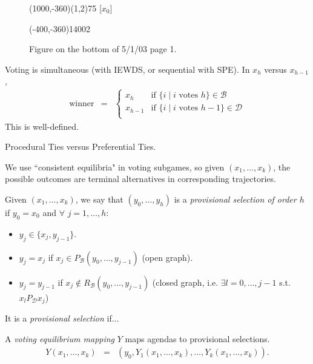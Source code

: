 \documentclass[12pt]{article}
\newcommand{\n}{\noindent}
\newcommand{\s}{\vspace{5mm}}
\begin{document}
\begin{figure}[htb]
\begin{egame}
\putbranch(1000,-360)(1,2){75}
\ib{}{}[$x_0$]






\infoset(-400,-360){1400}{2}
%
\end{egame}
\hspace*{\fill}\s\s\s\s\s\s\s\s\s\s\s\s
\caption[]{Figure on the bottom of 5/1/03 page 1.}\label{f:sixteen}
\end{figure}



\s
\n Voting is simultaneous (with IEWDS, or sequential with SPE).  In $x_h$ versus $x_{h-1}$,
\begin{eqnarray*}
\mbox{winner}&=&\left\{\begin{array}{ll}
x_h&\mbox{if }\{i\mid i\mbox{ votes }h\}\in\mathcal{B}\\
x_{h-1}&\mbox{if }\{i\mid i\mbox{ votes }h-1\}\in\mathcal{D}\\
\end{array}\right.
\end{eqnarray*}  This is well-defined.

\s
\n  Procedural Ties versus Preferential Ties.

\s
\n  We use ``consistent equilibria" in voting subgames, so given $(x_1,\hdots,x_k)$, the possible outcomes are terminal alternatives in corresponding trajectories.  

\s
\n Given $(x_1,\hdots,x_k)$, we say that $(y_0,\hdots,y_h)$ is a \textit{provisional selection of order $h$} if $y_0=x_0$ and $\forall$ $j=1,\hdots,h$:
\begin{itemize}
\item $y_j\in\{x_j,y_{j-1}\}$.
\item $y_j=x_j$ if $x_j\in P_{\mathcal{B}}(y_0,\hdots,y_{j-1})$ (open graph).
\item $y_j=y_{j-1}$ if $x_j\notin R_{\mathcal{B}}(y_0,\hdots,y_{j-1})$ (closed graph, i.e. $\exists l=0,\hdots,j-1$ s.t. $x_l P_{\mathcal{D}} x_j$)
\end{itemize}  It is a \textit{provisional selection} if...

\s
\n  A \textit{voting equilibrium mapping} $Y$ maps agendas to provisional selections.
\begin{eqnarray*}
Y(x_1,\hdots,x_k)&=&(y_0,Y_1(x_1,\hdots,x_k),\hdots,Y_k(x_1,\hdots,x_k)).
\end{eqnarray*}
\end{document}
